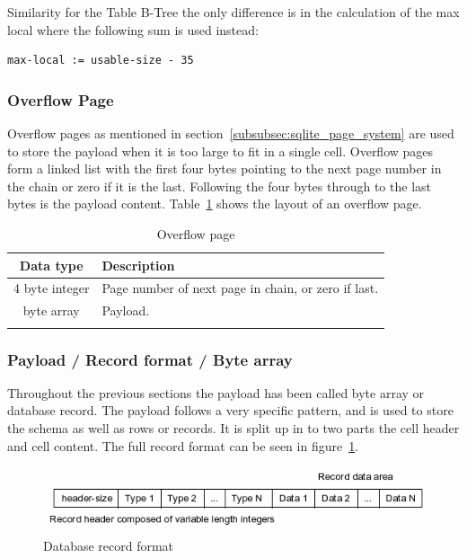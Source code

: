 Similarity for the Table B-Tree the only difference is in the calculation of the max local where the following sum is used instead:

\begin{lstlisting}	
max-local := usable-size - 35
\end{lstlisting}

\subsubsection{Overflow Page}
\label{subsubsec:overflow_page}

Overflow pages as mentioned in section~\ref{subsubsec:sqlite_page_system} are used to store the payload when it is too large to fit in a single cell. Overflow pages form a linked list with the first four bytes pointing to the next page number in the chain or zero if it is the last. Following the four bytes through to the last bytes is the payload content. Table~\ref{tbl:overflow_page} shows the layout of an overflow page.

\begin{longtable}[h]{| c | p{5cm} |}
		\hline
			\textbf{Data type} & \textbf{Description} \\ 
		\hline
		\endhead
			4 byte integer & Page number of next page in chain, or zero if last. \\
		\hline
			byte array & Payload. \\
		\hline
	\caption{Overflow page}
	\label{tbl:overflow_page}
\end{longtable}

\subsubsection{Payload / Record format / Byte array}
\label{subsubsec:record_format}

Throughout the previous sections the payload has been called byte array or database record. The payload follows a very specific pattern, and is used to store the schema as well as rows or records. It is split up in to two parts the cell header and cell content. The full record format can be seen in figure~\ref{fig:sqlite_record_format}.

\begin{figure}[H]
	\centering
	\includegraphics[scale=0.7]{images/recordformat.png}
	\caption{Database record format \citep{sqliteray}}
	\label{fig:sqlite_record_format}
\end{figure}

